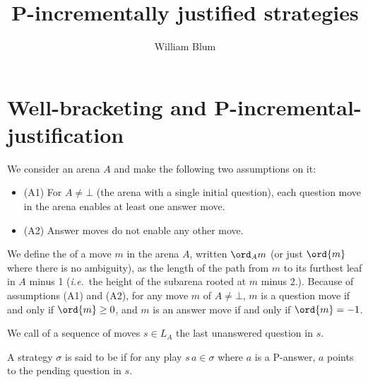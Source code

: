 



\author{William Blum}
\title{P-incrementally justified strategies}


\maketitle 

\section{Well-bracketing and P-incremental-justification}

We consider an arena $A$ and make the following two assumptions on it:
\begin{itemize}
\item (A1) For $A \neq \bot$ (the arena with a single initial question), each question move in the arena enables at least one answer move.
\item (A2) Answer moves do not enable any other move.
\end{itemize}

We define the  of a move $m$ in the arena $A$, written $\ord_A{m}$ (or just $\ord{m}$ where there is no ambiguity), as the length of the path from $m$ to its furthest leaf in $A$ minus 1
({\it i.e.}~the height of the subarena rooted at $m$ minus 2.).
Because of assumptions (A1) and (A2),
for any move $m$ of $A \neq \bot$, $m$ is a question move if and only if $\ord{m} \geq 0$, and $m$ is an answer move if and only if $\ord{m} = -1$.





We call  of a sequence of moves $s \in L_A$ the last unanswered question in $s$.

\begin{definition}\rm
A strategy $\sigma$ is said to be  if for any play $s \, a \in \sigma$ where $a$ is a  P-answer, $a$ points to the pending question in $s$.
\end{definition}



